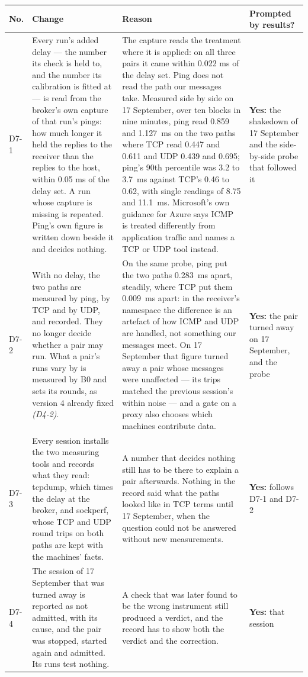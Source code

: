 \documentclass[11pt]{article}
\newcommand{\gl}[1]{{\color{soft}\itshape\small (#1)}}
\begin{document}
{\small
\begin{longtable}{@{}p{1.0cm} >{\raggedright\arraybackslash}p{6.2cm} >{\raggedright\arraybackslash}p{6.0cm} >{\raggedright\arraybackslash}p{2.2cm}@{}}
\toprule
\textbf{No.} & \textbf{Change} & \textbf{Reason} & \textbf{Prompted by results?} \\
\midrule
\endhead
D7-1 & Every run's added delay --- the number its check is held to, and the number its calibration is fitted at --- is read from the broker's own capture of that run's pings: how much longer it held the replies to the receiver than the replies to the host, within 0.05 ms of the delay set. A run whose capture is missing is repeated. Ping's own figure is written down beside it and decides nothing. & The capture reads the treatment where it is applied: on all three pairs it came within 0.022 ms of the delay set. Ping does not read the path our messages take. Measured side by side on 17 September, over ten blocks in nine minutes, ping read 0.859 and 1.127~ms on the two paths where TCP read 0.447 and 0.611 and UDP 0.439 and 0.695; ping's 90th percentile was 3.2 to 3.7~ms against TCP's 0.46 to 0.62, with single readings of 8.75 and 11.1~ms. Microsoft's own guidance for Azure says ICMP is treated differently from application traffic and names a TCP or UDP tool instead. & \textbf{Yes:} the shakedown of 17 September and the side-by-side probe that followed it \\
D7-2 & With no delay, the two paths are measured by ping, by TCP and by UDP, and recorded. They no longer decide whether a pair may run. What a pair's runs vary by is measured by B0 and sets its rounds, as version 4 already fixed \gl{D4-2}. & On the same probe, ping put the two paths 0.283~ms apart, steadily, where TCP put them 0.009~ms apart: in the receiver's namespace the difference is an artefact of how ICMP and UDP are handled, not something our messages meet. On 17 September that figure turned away a pair whose messages were unaffected --- its trips matched the previous session's within noise --- and a gate on a proxy also chooses which machines contribute data. & \textbf{Yes:} the pair turned away on 17 September, and the probe \\
D7-3 & Every session installs the two measuring tools and records what they read: tcpdump, which times the delay at the broker, and sockperf, whose TCP and UDP round trips on both paths are kept with the machines' facts. & A number that decides nothing still has to be there to explain a pair afterwards. Nothing in the record said what the paths looked like in TCP terms until 17 September, when the question could not be answered without new measurements. & \textbf{Yes:} follows D7-1 and D7-2 \\
D7-4 & The session of 17 September that was turned away is reported as not admitted, with its cause, and the pair was stopped, started again and admitted. Its runs test nothing. & A check that was later found to be the wrong instrument still produced a verdict, and the record has to show both the verdict and the correction. & \textbf{Yes:} that session \\
\bottomrule
\end{longtable}}
\end{document}
